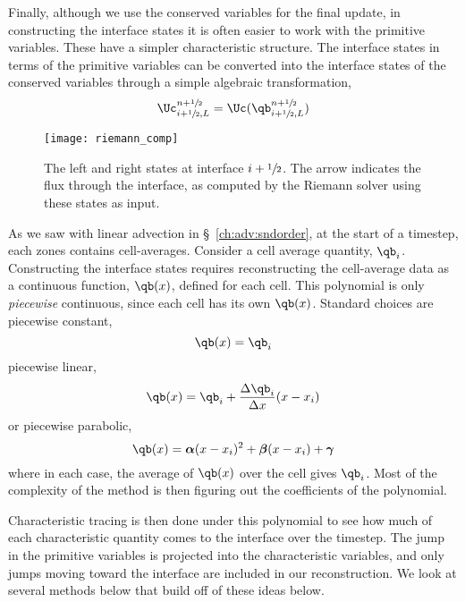Finally, although we use the conserved variables for the final update,
in constructing the interface states it is often easier to work with
the primitive variables.  These have a simpler characteristic
structure.  The interface states in terms of the primitive variables
can be converted into the interface states of the conserved variables
through a simple algebraic transformation,
\begin{equation}
\Uc_{i+\myhalf,L}^{n+\myhalf} = \Uc(\qb_{i+\myhalf,L}^{n+\myhalf})
\end{equation}

\begin{figure}[t]
\centering
\texttt{[image: riemann\_comp]}
\caption[The left and right states for the Riemann
  problem]{\label{fig:riemann} The left and right states at interface
  $i+{\sfrac{1}{2}}$.  The arrow indicates the flux through the interface, as
  computed by the Riemann solver using these states as input.}
\end{figure}

As we saw with linear advection in \S~\ref{ch:adv:sndorder},
at the start of a timestep, each zones contains cell-averages.
Consider a cell average quantity, $\qb_i$.
Constructing the interface states requires reconstructing the
cell-average data as a continuous function, $\qb(x)$, defined for
each cell.  This polynomial is only {\em piecewise} continuous, since
each cell has its own $\qb(x)$.  Standard choices are piecewise constant,
\begin{equation}
\qb(x) = \qb_i
\end{equation}
piecewise linear,
\begin{equation}
\qb(x) = \qb_i + \frac{\Delta \qb_i}{\Delta x}(x - x_i)
\end{equation}
or piecewise parabolic,
\begin{equation}
\qb(x) = \boldsymbol{\alpha} (x - x_i)^2 + \boldsymbol{\beta} (x - x_i) + \boldsymbol{\gamma}
\end{equation}
where in each case, the average of $\qb(x)$ over the cell gives $\qb_i$.
Most of the complexity of the method is then figuring out the coefficients
of the polynomial.

Characteristic tracing is then done under this polynomial to see how
much of each characteristic quantity comes to the interface over the
timestep.  The jump in the primitive variables is projected into the
characteristic variables, and only jumps moving toward the interface
are included in our reconstruction.  We look at several methods below
that build off of these ideas below.

